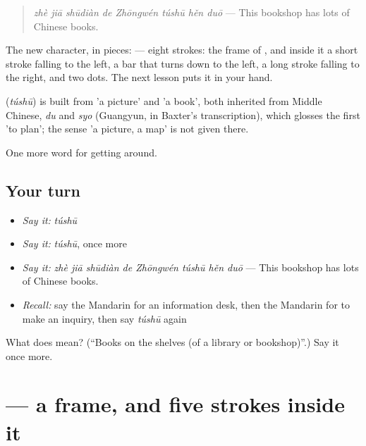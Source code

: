 \begin{quote}
\textbf{} \emph{zhè jiā shūdiàn de Zhōngwén túshū hěn duō} — This bookshop has lots of Chinese books.
\end{quote}

The new character, in pieces:  — eight strokes: the frame of , and inside it a short stroke falling to the left, a bar that turns down to the left, a long stroke falling to the right, and two dots. The next lesson puts it in your hand.

\begin{cousinweb}
\textbf{} (\emph{túshū}) is built from  'a picture' and  'a book', both inherited from Middle Chinese, \emph{du} and \emph{syo} (Guangyun, in Baxter's transcription), which glosses the first 'to plan'; the sense 'a picture, a map' is not given there.
\end{cousinweb}

\begin{grammarlens}[title={What you've built}]
One more word for getting around.
\end{grammarlens}

\subsection*{Your turn}
\begin{itemize}
\raggedright
  \item \emph{Say it:} \emph{túshū}
  \item \emph{Say it:} \emph{túshū}, once more
  \item \emph{Say it:} \emph{zhè jiā shūdiàn de Zhōngwén túshū hěn duō} — This bookshop has lots of Chinese books.
  \item \emph{Recall:} say the Mandarin for an information desk, then the Mandarin for to make an inquiry, then say \emph{túshū} again
\end{itemize}

\begin{tcolorbox}[breakable,colback=teal!4,colframe=teal!35!black,title={Before you move on}]
What does  mean? (\textquotedblleft{}Books on the shelves (of a library or bookshop)\textquotedblright{}.) Say it once more.
\end{tcolorbox}
\section[\texorpdfstring{\zh{图} (tú)}{图 (tú)}]{ — a frame, and five strokes inside it}


